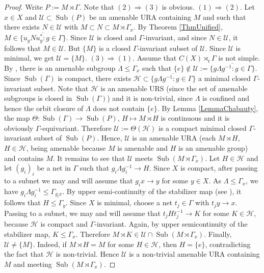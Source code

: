 \documentclass[12pt]{amsart} %
\theoremstyle{plain}
\theoremstyle{definition}
\newcommand{\Ucal}{\mathcal{U}}
\DeclareMathOperator{\Sub}{Sub}
\begin{document}
\begin{proof}
Write $P:=M\rtimes\Gamma$. Note that $(2)\Rightarrow(3)$ is obvious.
\medskip
\noindent$(1)\Rightarrow(2)$. Let $x\in X$ and $\mathcal U\subset \operatorname{Sub}(P)$ be an amenable URA containing $M$ and such that there exists $N\in\Ucal$ with $M\subset N\subset M\rtimes\Gamma_x$. By Theorem \ref{ThmUnified}, $M\in \overline{\{u_gNu_g^*:g\in\Gamma\}}$. Since \(\mathcal U\) is closed and \(\Gamma\)-invariant, and since \(N\in\mathcal U\), it follows that $M\in\Ucal$. But \(\{M\}\) is a closed \(\Gamma\)-invariant subset of \(\mathcal U\). Since \(\mathcal U\) is minimal, we get $ \mathcal U=\{M\}$.
\medskip
\noindent$(3)\Rightarrow(1)$. Assume that \(C(X)\rtimes_{\mathrm r}\Gamma\) is not simple. By \cite[Theorem 1.7 (iii)]{kawabe2017uniformly}, there is an amenable subgroup \(\Lambda\leq \Gamma_x\) such that $\{e\}\notin\Ucal:=\overline{\{g \Lambda g^{-1}:g\in\Gamma\}}$. Since $\Sub(\Gamma)$ is compact, there exists $\mathcal H\subset\overline{\{g\Lambda g^{-1}:g\in\Gamma\}}$ a minimal closed \(\Gamma\)-invariant subset. Note that \(\mathcal H\) is an amenable URS (since the set of amenable subgroups is closed in $\Sub(\Gamma)$) and it is non-trivial, since \(\Lambda\) is confined and hence the orbit closure of \(\Lambda\) does not contain \(\{e\}\). By Lemma \ref{LemmaChabauty}, the map $\Theta:\operatorname{Sub}(\Gamma)\to \operatorname{Sub}(P)$, $H\mapsto M\rtimes H$  is continuous and it is obviously \(\Gamma\)-equivariant. Therefore $\mathcal U:=\Theta(\mathcal H)$ is a compact minimal closed \(\Gamma\)-invariant subset of \(\operatorname{Sub}(P)\). Hence, \(\mathcal U\) is an amenable URA  (each $M\rtimes H$, $H\in\mathcal H$, being amenable because $M$ is amenable and $H$ is an amenable group) and contains $M$. It remains to see that \(\mathcal U\) meets \(\operatorname{Sub}(M\rtimes\Gamma_x)\). Let \(H\in\mathcal H\) and let \((g_i)_i\) be a net in \(\Gamma\) such that $g_i\Lambda g_i^{-1}\to H$. Since \(X\) is compact, after passing to a subnet we may and will assume that \(g_i x\to y\) for some \(y\in X\). As \(\Lambda\leq \Gamma_x\), we have $g_i\Lambda g_i^{-1}\leq \Gamma_{g_i x}$. By upper semi-continuity of the stabilizer map (see \cite{glasner2015uniformly}), it follows that $H\leq \Gamma_y$. Since \(X\) is minimal, choose a net \(t_j\in\Gamma\) with $t_jy\to x$. Passing to a subnet, we may and will assume that $t_jHt_j^{-1}\to K$ for some \(K\in\mathcal H\), because \(\mathcal H\) is compact and \(\Gamma\)-invariant. Again, by upper semicontinuity of the stabilizer map, $K\leq \Gamma_x$. Therefore $M\rtimes K\in \mathcal U\cap\operatorname{Sub}(M\rtimes\Gamma_x)$. Finally, \(\mathcal U\neq \{M\}\). Indeed, if \(M\rtimes H=M\) for some \(H\in\mathcal H\), then \(H=\{e\}\), contradicting the fact that \(\mathcal H\) is non-trivial. Hence \(\mathcal U\) is a non-trivial amenable URA containing \(M\) and meeting \(\operatorname{Sub}(M\rtimes\Gamma_x)\).\end{proof}
\end{document}
